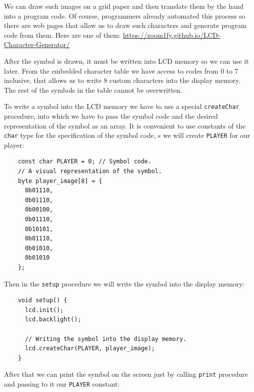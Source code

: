\documentclass[../sparc.tex]{subfiles}
\begin{document}

We can draw such images on a grid paper and then translate them by the hand into
a program code.  Of course, programmers already automated this process so there
are web pages that allow us to draw such characters and generate program code
from them.  Here are one of them:
\url{https://zoom1fy.github.io/LCD-Character-Generator/}

After the symbol is drawn, it must be written into LCD memory so we can use it
later.  From the embedded character table we have access to codes from 0 to 7
inclusive, that allows us to write 8 custom characters into the display memory.
The rest of the symbols in the table cannot be overwritten.

To write a symbol into the LCD memory we have to use a special
\texttt{createChar} procedure, into which we have to pass the symbol
code and the desired representation of the symbol as an array.  It is convenient
to use constants of the \texttt{char} type for the specification of the
symbol code, s we will create \texttt{PLAYER} for our player:

\begin{listing}[H]
  \begin{verbatim}
    const char PLAYER = 0; // Symbol code.
    // A visual representation of the symbol.
    byte player_image[8] = {
      0b01110,
      0b01110,
      0b00100,
      0b01110,
      0b10101,
      0b01110,
      0b01010,
      0b01010
    };
  \end{verbatim}
  \caption{Creating a character constant for storing the code of a custom
    symbol.}
  \label{listing:game-dev-lcd-custom-char-const}
\end{listing}

Then in the \texttt{setup} procedure we will write the symbol into the
display memory:

\begin{listing}[H]
  \begin{verbatim}
    void setup() {
      lcd.init();
      lcd.backlight();

      // Writing the symbol into the display memory.
      lcd.createChar(PLAYER, player_image);
    }
  \end{verbatim}
  \caption{Writing of a custom symbol into the display memory.}
  \label{listing:game-dev-lcd-create-char}
\end{listing}

After that we can print the symbol on the screen just by calling
\texttt{print} procedure and passing to it our \texttt{PLAYER}
constant:
\end{document}
